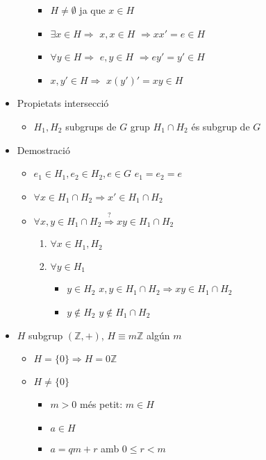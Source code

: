 \documentclass{article}
\newcommand{\Z}{\mathbb{Z}}
\begin{document}
\begin{itemize}
\begin{itemize}
		\begin{itemize}
		\item $H \neq \emptyset$ ja que $x \in H$
		\item $\exists x \in H \Rightarrow$ $x, x \in H$ $\Rightarrow xx' = e \in H$
		\item $\forall y \in H \Rightarrow$ $e, y \in H$ $\Rightarrow ey' = y' \in H$
		\item $x, y' \in H \Rightarrow$ $x(y')' = xy \in H$
		\end{itemize}
	\end{itemize}
\item Propietats intersecció
	\begin{itemize}
	\item $H_1, H_2$ subgrups de $G$ grup
		\subitem $H_1 \cap H_2$ és subgrup de $G$
	\end{itemize}
\item Demostració
	\begin{itemize}
	\item $e_1 \in H_1, e_2 \in H_2, e \in G$
		\subitem $e_1 = e_2 = e$
	\item $\forall x \in H_1 \cap H_2 \Rightarrow x' \in H_1 \cap H_2$
	\item $\forall x, y \in H_1 \cap H_2 \overset{?}{\Rightarrow} xy \in H_1 \cap H_2$
		\begin{enumerate}
		\item $\forall x \in H_1, H_2$
		\item $\forall y \in H_1$
			\begin{itemize}
			\item $y \in H_2$
				\subitem $x, y \in H_1 \cap H_2 \Rightarrow xy \in H_1 \cap H_2$
			\item $y \notin H_2$
				\subitem $y \notin H_1 \cap H_2$
			\end{itemize}
		\end{enumerate}
	\end{itemize}
\item $H$ subgrup $(\Z, +)$, $H \equiv m\Z$ algún $m$
	\begin{itemize}
	\item $H = \{0\} \Rightarrow H = 0 \Z$
	\item $H \neq \{0\}$
		\begin{itemize}
		\item $m > 0$ més petit: $m \in H$
		\item $a \in H$
		\item $a = qm + r$ amb $0 \le r < m$
			\begin{itemize}

\end{itemize}
\end{itemize}
\end{itemize}
\end{itemize}
\end{document}
